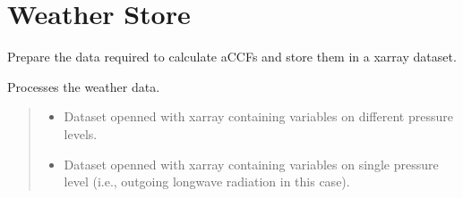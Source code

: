 \documentclass[a4paper,11pt,english]{sphinxmanual}
\begin{document}
\section{Weather Store}
\label{\detokenize{modules:weather-store}}

\begin{fulllineitems}
\label{\detokenize{modules:climaccf.weather_store.WeatherStore}}
\pysigstartsignatures
{}
\pysigstopsignatures
\sphinxAtStartPar
Prepare the data required to calculate aCCFs and store them in a xarray dataset.

\begin{fulllineitems}
\label{\detokenize{modules:climaccf.weather_store.WeatherStore.__init__}}
\pysigstartsignatures
{}
\pysigstopsignatures
\sphinxAtStartPar
Processes the weather data.
\begin{quote}\begin{description}
\begin{itemize}
\item {} 
\sphinxAtStartPar
{} \textendash{} Dataset openned with xarray containing variables on different pressure levels.

\item {} 
\sphinxAtStartPar
{} \textendash{} Dataset openned with xarray containing variables on single pressure level (i.e., outgoing longwave radiation in this case).


\end{itemize}
\end{description}
\end{quote}
\end{fulllineitems}
\end{fulllineitems}
\end{document}
